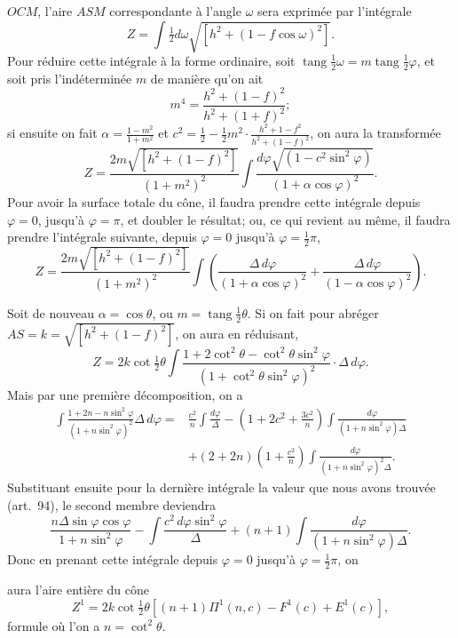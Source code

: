 \documentclass{article}
\begin{document}
$OCM$, l'aire $ASM$ correspondante à l'angle $\omega$ sera exprimée par l'intégrale
\[ Z=\int\tfrac{1}{2}d\omega\sqrt{[h^{2}+(1-f\cos\omega)^{2}]}. \]
Pour réduire cette intégrale à la forme ordinaire, soit $\operatorname{tang}\frac{1}{2}\omega=m\operatorname{tang}\frac{1}{2}\varphi$, et soit pris l'indéterminée $m$ de manière qu'on ait
\[ m^{4}=\frac{h^{2}+(1-f)^{2}}{h^{2}+(1+f)^{2}}; \]
si ensuite on fait $\alpha=\frac{1-m^{2}}{1+m^{2}}$ et $c^{2}=\frac{1}{2}-\frac{1}{2}m^{2}\cdot\frac{h^{2}+1-f^{2}}{h^{2}+(1-f)^{2}}$, on aura la transformée
\[ Z=\frac{2m\sqrt{[h^{2}+(1-f)^{2}]}}{(1+m^{2})^{2}}\int\frac{d\varphi\sqrt{(1-c^{2}\sin^{2}\varphi)}}{(1+\alpha\cos\varphi)^{2}}. \]
Pour avoir la surface totale du cône, il faudra prendre cette intégrale depuis $\varphi=0$, jusqu'à $\varphi=\pi$, et doubler le résultat; ou, ce qui revient au même, il faudra prendre l'intégrale suivante, depuis $\varphi=0$ jusqu'à $\varphi=\frac{1}{2}\pi$,
\[ Z=\frac{2m\sqrt{[h^{2}+(1-f)^{2}]}}{(1+m^{2})^{2}}\int\left(\frac{\Delta\,d\varphi}{(1+\alpha\cos\varphi)^{2}}+\frac{\Delta\,d\varphi}{(1-\alpha\cos\varphi)^{2}}\right). \]

Soit de nouveau $\alpha=\cos\theta$, ou $m=\operatorname{tang}\frac{1}{2}\theta$. Si on fait pour abréger $AS=k=\sqrt{[h^{2}+(1-f)^{2}]}$, on aura en réduisant,
\[ Z=2k\cot\tfrac{1}{2}\theta\int\frac{1+2\cot^{2}\theta-\cot^{2}\theta\sin^{2}\varphi}{(1+\cot^{2}\theta\sin^{2}\varphi)^{2}}\cdot\Delta\,d\varphi. \]
Mais par une première décomposition, on a
\[ \begin{aligned} \int\frac{1+2n-n\sin^{2}\varphi}{(1+n\sin^{2}\varphi)^{2}}\Delta\,d\varphi={}&\frac{c^{2}}{n}\int\frac{d\varphi}{\Delta}-\left(1+2c^{2}+\frac{3c^{2}}{n}\right)\int\frac{d\varphi}{(1+n\sin^{2}\varphi)\Delta}\\ &+(2+2n)\left(1+\frac{c^{2}}{n}\right)\int\frac{d\varphi}{(1+n\sin^{2}\varphi)^{2}\Delta}. \end{aligned} \]
Substituant ensuite pour la dernière intégrale la valeur que nous avons trouvée (art.\ 94), le second membre deviendra
\[ \frac{n\Delta\sin\varphi\cos\varphi}{1+n\sin^{2}\varphi}-\int\frac{c^{2}\,d\varphi\sin^{2}\varphi}{\Delta}+(n+1)\int\frac{d\varphi}{(1+n\sin^{2}\varphi)\Delta}. \]
Donc en prenant cette intégrale depuis $\varphi=0$ jusqu'à $\varphi=\frac{1}{2}\pi$, on

aura l'aire entière du cône
\[ Z^{1}=2k\cot\tfrac{1}{2}\theta[(n+1)\Pi^{1}(n,c)-F^{1}(c)+E^{1}(c)], \]
formule où l'on a $n=\cot^{2}\theta$.
\end{document}
